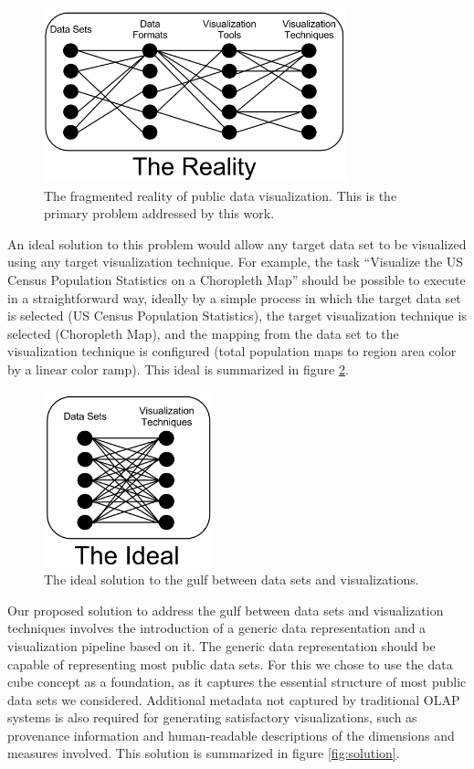 \documentclass[12pt]{article}
\begin{document}
\begin{doublespace}
\begin{figure}[h]
  \centering
  \includegraphics[height=2in]{figures/Reality.png}
  \caption[The fragmented reality of public data visualization.]
   {The fragmented reality of public data visualization. This is the primary problem addressed by this work. }
  \label{fig:reality}
\end{figure}

An ideal solution to this problem would allow any target data set to be visualized using any target visualization technique. For example, the task ``Visualize the US Census Population Statistics on a Choropleth Map'' should be possible to execute in a straightforward way, ideally by a simple process in which the target data set is selected (US Census Population Statistics), the target visualization technique is selected (Choropleth Map), and the mapping from the data set to the visualization technique is configured (total population maps to region area color by a linear color ramp). This ideal is summarized in figure \ref{fig:ideal}.

\begin{figure}[h]
  \centering
  \includegraphics[height=2in]{figures/Ideal.png}
  \caption[The ideal solution to the gulf between data sets and visualizations.]
   {The ideal solution to the gulf between data sets and visualizations.}
  \label{fig:ideal}
\end{figure}

Our proposed solution to address the gulf between data sets and visualization techniques involves the introduction of a generic data representation and a visualization pipeline based on it. The generic data representation should be capable of representing most public data sets. For this we chose to use the data cube concept as a foundation, as it captures the essential structure of most public data sets we considered. Additional metadata not captured by traditional OLAP systems is also required for generating satisfactory visualizations, such as provenance information and human-readable descriptions of the dimensions and measures involved. This solution is summarized in figure \ref{fig:solution}.


\end{doublespace}
\end{document}
